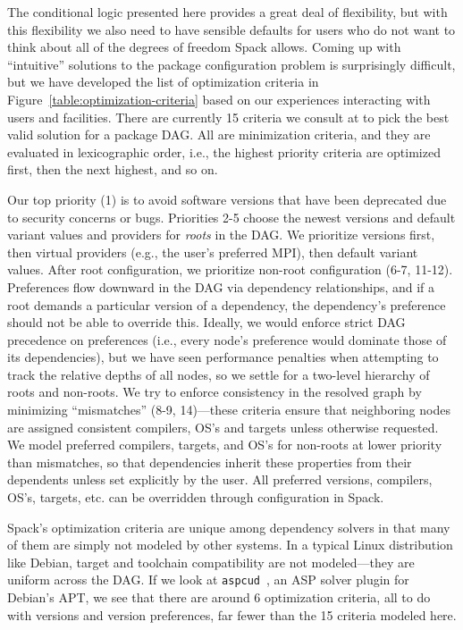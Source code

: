 The conditional logic presented here provides a great deal of flexibility, but with this
flexibility we also need to have sensible defaults for users who do not want to think
about all of the degrees of freedom Spack allows. Coming up with ``intuitive'' solutions
to the package configuration problem is surprisingly difficult, but we have developed
the list of optimization criteria in Figure~\ref{table:optimization-criteria} based on
our experiences interacting with users and facilities. There are currently 15 criteria
we consult at to pick the best valid solution for a package DAG. All are minimization
criteria, and they are evaluated in lexicographic order, i.e., the highest priority
criteria are optimized first, then the next highest, and so on.

Our top priority (1) is to avoid software versions that have been deprecated due to
security concerns or bugs. Priorities 2-5 choose the newest versions and default variant
values and providers for {\it roots} in the DAG. We prioritize versions first, then
virtual providers (e.g., the user's preferred MPI), then default variant values. After
root configuration, we prioritize non-root configuration (6-7, 11-12). Preferences flow
downward in the DAG via dependency relationships, and if a root demands a particular
version of a dependency, the dependency's preference should not be able to override
this. Ideally, we would enforce strict DAG precedence on preferences (i.e., every node's
preference would dominate those of its dependencies), but we have seen performance
penalties when attempting to track the relative depths of all nodes, so we settle for a
two-level hierarchy of roots and non-roots. We try to enforce consistency in the
resolved graph by minimizing ``mismatches'' (8-9, 14)---these criteria ensure that
neighboring nodes are assigned consistent compilers, OS's and targets unless otherwise
requested. We model preferred compilers, targets, and OS's for non-roots at lower
priority than mismatches, so that dependencies inherit these properties from their
dependents unless set explicitly by the user. All preferred versions, compilers, OS's,
targets, etc. can be overridden through configuration in Spack.

Spack's optimization criteria are unique among dependency solvers in that many of them
are simply not modeled by other systems. In a typical Linux distribution like Debian,
target and toolchain compatibility are not modeled---they are uniform across the DAG. If
we look at {\tt aspcud}~\cite{gebser+:2011-aspcud}, an ASP solver plugin for Debian's
APT, we see that there are around 6 optimization criteria, all to do with
versions and version preferences, far fewer than the 15 criteria modeled here.

